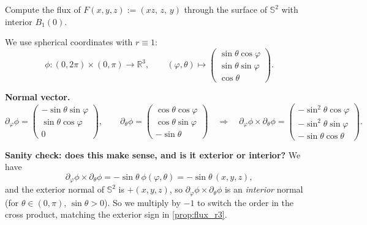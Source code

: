 \begin{example}
\label{ex:flux_unit_sphere}
Compute the flux of $F(x,y,z) := (xz,\,z,\,y)$ through the surface of $\mathbb{S}^2$ with
interior $B_1(0)$.

We use spherical coordinates with $r\equiv1$:
\[\phi : (0,2\pi)\times(0,\pi) \to \mathbb{R}^3, \qquad (\varphi,\theta) \mapsto
  \begin{pmatrix}\sin\theta\cos\varphi \\ \sin\theta\sin\varphi \\ \cos\theta\end{pmatrix}.\]

\textbf{Normal vector.}
\[\partial_\varphi\phi = \begin{pmatrix}-\sin\theta\sin\varphi\\ \sin\theta\cos\varphi\\
  0\end{pmatrix}, \qquad \partial_\theta\phi = \begin{pmatrix}\cos\theta\cos\varphi\\
  \cos\theta\sin\varphi\\ -\sin\theta\end{pmatrix}
  \quad \Longrightarrow \quad \partial_\varphi\phi\times\partial_\theta\phi
  = \begin{pmatrix}-\sin^2\theta\cos\varphi\\ -\sin^2\theta\sin\varphi\\
  -\sin\theta\cos\theta\end{pmatrix}.\]

\textbf{Sanity check: does this make sense, and is it exterior or interior?} We have
\[\partial_\varphi\phi\times\partial_\theta\phi = -\sin\theta\ \phi(\varphi,\theta)
  = -\sin\theta\,(x,y,z),\]
and the exterior normal of $\mathbb{S}^2$ is $+(x,y,z)$, so $\partial_\varphi\phi\times
\partial_\theta\phi$ is an \emph{interior} normal (for $\theta\in(0,\pi)$, $\sin\theta>0$).
So we multiply by $-1$ to switch the order in the cross product, matching the exterior sign
in \cref{prop:flux_r3}.


\end{example}
